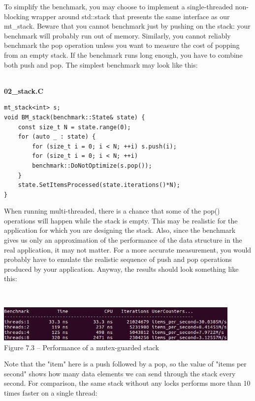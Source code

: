 To simplify the benchmark, you may choose to implement a single-threaded non-blocking wrapper around std::stack that presents the same interface as our mt\_stack. Beware that you cannot benchmark just by pushing on the stack: your benchmark will probably run out of memory.  Similarly, you cannot reliably benchmark the pop operation unless you want to measure the cost of popping from an empty stack. If the benchmark runs long enough, you have to combine both push and pop. The simplest benchmark may look like this:

\hspace*{\fill} \\ %
\noindent
\textbf{02\_stack.C}
\begin{lstlisting}[style=styleCXX]
mt_stack<int> s;
void BM_stack(benchmark::State& state) {
	const size_t N = state.range(0);
	for (auto _ : state) {
		for (size_t i = 0; i < N; ++i) s.push(i);
		for (size_t i = 0; i < N; ++i)
		benchmark::DoNotOptimize(s.pop());
	}
	state.SetItemsProcessed(state.iterations()*N);
}
\end{lstlisting}

When running multi-threaded, there is a chance that some of the pop() operations will happen while the stack is empty. This may be realistic for the application for which you are designing the stack. Also, since the benchmark gives us only an approximation of the performance of the data structure in the real application, it may not matter. For a more accurate measurement, you would probably have to emulate the realistic sequence of push and pop operations produced by your application. Anyway, the results should look something like this:

\hspace*{\fill} \\ %
\begin{center}
\includegraphics[width=0.9\textwidth]{content/2/chapter7/images/3.jpg}\\
Figure 7.3 – Performance of a mutex-guarded stack
\end{center}

Note that the "item" here is a push followed by a pop, so the value of "items per second" shows how many data elements we can send through the stack every second. For comparison, the same stack without any locks performs more than 10 times faster on a single thread:

